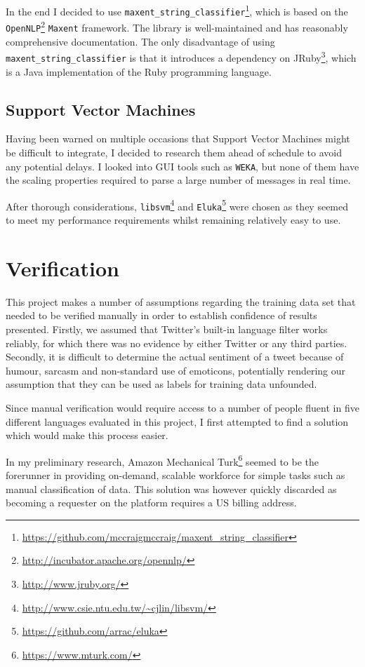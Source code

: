 In the end I decided to use \verb|maxent_string_classifier|\footnote{\url{https://github.com/mccraigmccraig/maxent_string_classifier}}, which is based on the \verb|OpenNLP|\footnote{\url{http://incubator.apache.org/opennlp/}} \verb|Maxent| framework. The library is well-maintained and has reasonably comprehensive documentation. The only disadvantage of using \verb|maxent_string_classifier| is that it introduces a dependency on JRuby\footnote{\url{http://www.jruby.org/}}, which is a Java implementation of the Ruby programming language.

\subsection{Support Vector Machines}

Having been warned on multiple occasions that Support Vector Machines might be difficult to integrate, I decided to research them ahead of schedule to avoid any potential delays. I looked into GUI tools such as \verb|WEKA|, but none of them have the scaling properties required to parse a large number of messages in real time.

After thorough considerations, \verb|libsvm|\footnote{\url{http://www.csie.ntu.edu.tw/~cjlin/libsvm/}} and \verb|Eluka|\footnote{\url{https://github.com/arrac/eluka}} were chosen as they seemed to meet my performance requirements whilst remaining relatively easy to use.

\section{Verification}

This project makes a number of assumptions regarding the training data set that needed to be verified manually in order to establish confidence of results presented. Firstly, we assumed that Twitter's built-in language filter works reliably, for which there was no evidence by either Twitter or any third parties. Secondly, it is difficult to determine the actual sentiment of a tweet because of humour, sarcasm and non-standard use of emoticons, potentially rendering our assumption that they can be used as labels for training data unfounded.

Since manual verification would require access to a number of people fluent in five different languages evaluated in this project, I first attempted to find a solution which would make this process easier.

In my preliminary research, Amazon Mechanical Turk\footnote{\url{https://www.mturk.com/}} seemed to be the forerunner in providing on-demand, scalable workforce for simple tasks such as manual classification of data. This solution was however quickly discarded as becoming a requester on the platform requires a US billing address.


